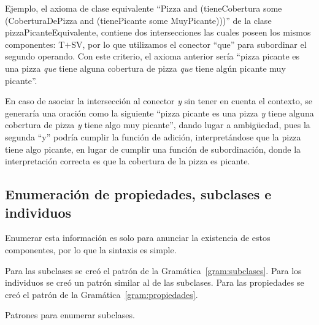 Ejemplo, el axioma de clase equivalente ``Pizza and (tieneCobertura some (CoberturaDePizza and (tienePicante some MuyPicante)))'' de la clase pizzaPicanteEquivalente, contiene dos intersecciones las cuales poseen los mismos componentes: T$+$SV, por lo que utilizamos el conector ``que'' para subordinar el segundo operando. Con este criterio, el axioma anterior sería ``pizza picante es una pizza \emph{que} tiene alguna cobertura de pizza \emph{que} tiene algún picante muy picante''.

En caso de asociar la intersección al conector \emph{y} sin tener en cuenta el contexto, se generaría una oración como la siguiente ``pizza picante es una pizza \emph{y} tiene alguna cobertura de pizza \emph{y} tiene algo muy picante'', dando lugar a ambigüedad, pues la segunda ``y'' podría cumplir la función de adición, interpretándose que la pizza tiene algo picante, en lugar de cumplir una función de subordinación, donde la interpretación correcta es que la cobertura de la pizza es picante. 

\subsection{Enumeración de propiedades, subclases e individuos}
Enumerar esta información es solo para anunciar la existencia de estos componentes, por lo que la sintaxis es simple.

Para las subclases se creó el patrón de la Gramática~\ref{gram:subclases}.
Para los individuos se creó un patrón similar al de las subclases.
Para las propiedades se creó el patrón de la Gramática~\ref{gram:propiedades}.

\begin{GrammarEnv}
\begin{grammar}
\end{grammar}
\caption{Patrones para enumerar subclases.}\label{gram:subclases}
\end{GrammarEnv}

